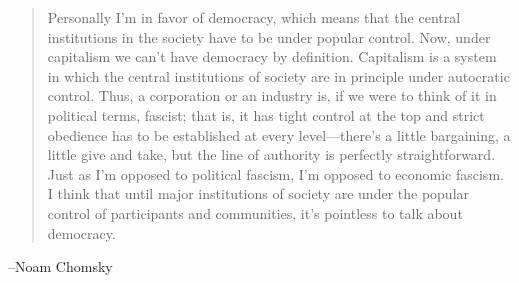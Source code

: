 \documentclass{exam}
\begin{document}
  \begin{quote}
    Personally I'm in favor of democracy, which means that the central institutions in the society have to be under popular
    control. Now, under capitalism we can't have democracy by definition. Capitalism is a system in which the central
    institutions of society are in principle under autocratic control. Thus, a corporation or an industry is, if we were to
    think of it in political terms, fascist; that is, it has tight control at the top and strict obedience has to be
    established at every level---there's a little bargaining, a little give and take, but the line of authority is
    perfectly straightforward. Just as I'm opposed to political fascism, I'm opposed to economic fascism. I think that until
    major institutions of society are under the popular control of participants and communities, it's pointless to talk
    about democracy.
  \end{quote}
  \vspace{.2 cm}

  \hspace{1 cm} --Noam Chomsky
\fi
\end{document}
